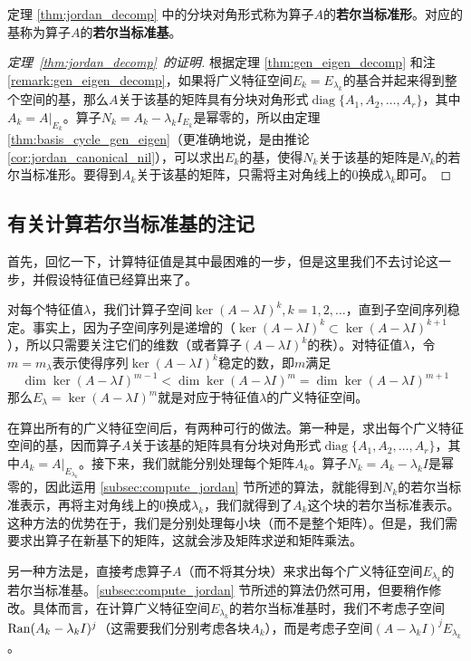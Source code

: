 定理 \ref{thm:jordan_decomp} 中的分块对角形式称为算子$A$的{\bf 若尔当标准形}。对应的基称为算子$A$的{\bf 若尔当标准基}。

\begin{proof}[定理~\ref{thm:jordan_decomp}~的证明]
    根据定理 \ref{thm:gen_eigen_decomp} 和注 \ref{remark:gen_eigen_decomp}，如果将广义特征空间$E_k=E_{\lambda_k}$的基合并起来得到整个空间的基，那么$A$关于该基的矩阵具有分块对角形式$\operatorname{diag}\{A_1,A_2,\dots,A_r\}$，其中$A_k=A|_{E_k}$。算子$N_k=A_k-\lambda_k I_{E_k}$是幂零的，所以由定理 \ref{thm:basis_cycle_gen_eigen}（更准确地说，是由推论 \ref{cor:jordan_canonical_nil}），可以求出$E_k$的基，使得$N_k$关于该基的矩阵是$N_k$的若尔当标准形。要得到$A_k$关于该基的矩阵，只需将主对角线上的$0$换成$\lambda_k$即可。
\end{proof}

\subsection{有关计算若尔当标准基的注记}

首先，回忆一下，计算特征值是其中最困难的一步，但是这里我们不去讨论这一步，并假设特征值已经算出来了。

对每个特征值$\lambda$，我们计算子空间$\ker(A-\lambda I)^k,k=1,2,\dots$，直到子空间序列稳定。事实上，因为子空间序列是递增的（$\ker(A-\lambda I)^k\subset \ker(A-\lambda I)^{k+1}$），所以只需要关注它们的维数（或者算子$(A-\lambda I)^k$的秩）。对特征值$\lambda$，令$m=m_\lambda$表示使得序列$\ker(A-\lambda I)^k$稳定的数，即$m$满足
\[\dim\ker (A-\lambda I)^{m-1}< \dim\ker (A-\lambda I)^{m} = \dim\ker (A-\lambda I)^{m+1}\]
那么$E_\lambda = \ker (A-\lambda I)^m$就是对应于特征值$\lambda$的广义特征空间。

在算出所有的广义特征空间后，有两种可行的做法。第一种是，求出每个广义特征空间的基，因而算子$A$关于该基的矩阵具有分块对角形式$\operatorname{diag}\{A_1,A_2,\dots,A_r\}$，其中$A_k=A|_{E_{\lambda_k}}$。接下来，我们就能分别处理每个矩阵$A_k$。算子$N_k=A_k-\lambda_k I$是幂零的，因此运用 \ref{subsec:compute_jordan} 节所述的算法，就能得到$N_k$的若尔当标准表示，再将主对角线上的$0$换成$\lambda_k$，我们就得到了$A_k$这个块的若尔当标准表示。这种方法的优势在于，我们是分别处理每小块（而不是整个矩阵）。但是，我们需要求出算子在新基下的矩阵，这就会涉及矩阵求逆和矩阵乘法。

另一种方法是，直接考虑算子$A$（而不将其分块）来求出每个广义特征空间$E_{\lambda_k}$的若尔当标准基。\ref{subsec:compute_jordan} 节所述的算法仍然可用，但要稍作修改。具体而言，在计算广义特征空间$E_{\lambda_k}$的若尔当标准基时，我们不考虑子空间$\operatorname{Ran}(A_k-\lambda_k I)^j$（这需要我们分别考虑各块$A_k$），而是考虑子空间$(A-\lambda_k I)^j E_{\lambda_k}$。